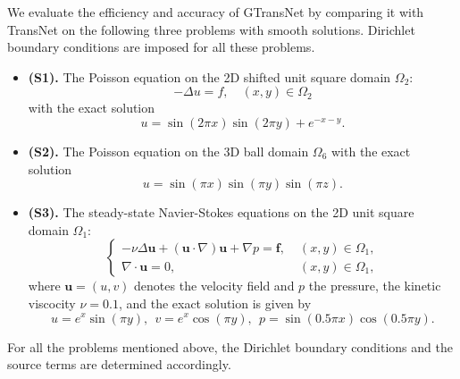 \documentclass{article}
\newcommand{\ds}{\displaystyle}
\begin{document}
We evaluate the efficiency and accuracy of GTransNet by comparing it with TransNet on the following three problems with smooth solutions. Dirichlet boundary conditions are imposed for all these problems.
\begin{itemize}
\item[]
\textbf{(S1).} {The Poisson equation} on the 2D shifted unit square domain $\Omega_2$:
 \begin{equation}\label{eq:Poisson}
     -\Delta u  = f, \quad (x,y)\in \Omega_2
 \end{equation}
with  the exact solution  
\begin{equation}
 u = \sin(2\pi x) \sin(2\pi y) + e^{-x - y}.
\end{equation}
\item[] 
\textbf{(S2).} {The Poisson equation} on the 3D ball domain $\Omega_6$ with the exact solution 
\begin{equation}
u = \sin(\pi x) \sin(\pi y) \sin(\pi z).\end{equation}
\item[] 
\textbf{(S3).} {The steady-state Navier-Stokes equations} on the 2D unit square domain $\Omega_1$:
\begin{equation}\label{eq:NS}
\begin{cases}
    -\nu\Delta \mathbf{u} + (\mathbf{u}\cdot\nabla)\mathbf{u} + \nabla p = \mathbf{f}, & \; (x,y)\in \Omega_1, \\
    \nabla \cdot \mathbf{u} = 0, & \; (x,y) \in \Omega_1,
\end{cases}
\end{equation}
where \( \mathbf{u} = (u, v) \) denotes the velocity field and $p$ the pressure, the kinetic viscocity \(\ds \nu = 0.1\), and the exact solution is given by 
\begin{equation}
u = e^x\sin(\pi y), ~~
v = e^x\cos(\pi y),~~
p = \sin(0.5\pi x)\cos(0.5\pi y).
\end{equation}
\end{itemize}
For all the problems mentioned above, the  Dirichlet boundary conditions and the source terms are determined accordingly.
\end{document}
